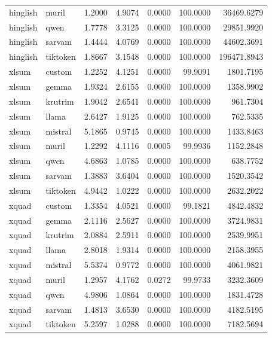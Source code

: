 \begin{tabular}{llrrrrr}
hinglish & muril & 1.2000 & 4.9074 & 0.0000 & 100.0000 & 36469.6279 \\
hinglish & qwen & 1.7778 & 3.3125 & 0.0000 & 100.0000 & 29851.9920 \\
hinglish & sarvam & 1.4444 & 4.0769 & 0.0000 & 100.0000 & 44602.3691 \\
hinglish & tiktoken & 1.8667 & 3.1548 & 0.0000 & 100.0000 & 196471.8943 \\
xlsum & custom & 1.2252 & 4.1251 & 0.0000 & 99.9091 & 1801.7195 \\
xlsum & gemma & 1.9324 & 2.6155 & 0.0000 & 100.0000 & 1358.9902 \\
xlsum & krutrim & 1.9042 & 2.6541 & 0.0000 & 100.0000 & 961.7304 \\
xlsum & llama & 2.6427 & 1.9125 & 0.0000 & 100.0000 & 762.5335 \\
xlsum & mistral & 5.1865 & 0.9745 & 0.0000 & 100.0000 & 1433.8463 \\
xlsum & muril & 1.2292 & 4.1116 & 0.0005 & 99.9936 & 1152.2848 \\
xlsum & qwen & 4.6863 & 1.0785 & 0.0000 & 100.0000 & 638.7752 \\
xlsum & sarvam & 1.3883 & 3.6404 & 0.0000 & 100.0000 & 1520.3542 \\
xlsum & tiktoken & 4.9442 & 1.0222 & 0.0000 & 100.0000 & 2632.2022 \\
xquad & custom & 1.3354 & 4.0521 & 0.0000 & 99.1821 & 4842.4832 \\
xquad & gemma & 2.1116 & 2.5627 & 0.0000 & 100.0000 & 3724.9831 \\
xquad & krutrim & 2.0884 & 2.5911 & 0.0000 & 100.0000 & 2539.9951 \\
xquad & llama & 2.8018 & 1.9314 & 0.0000 & 100.0000 & 2158.3955 \\
xquad & mistral & 5.5374 & 0.9772 & 0.0000 & 100.0000 & 4061.9821 \\
xquad & muril & 1.2957 & 4.1762 & 0.0272 & 99.9733 & 3232.3609 \\
xquad & qwen & 4.9806 & 1.0864 & 0.0000 & 100.0000 & 1831.4728 \\
xquad & sarvam & 1.4813 & 3.6530 & 0.0000 & 100.0000 & 4182.5195 \\
xquad & tiktoken & 5.2597 & 1.0288 & 0.0000 & 100.0000 & 7182.5694 \\
\bottomrule
\end{tabular}
